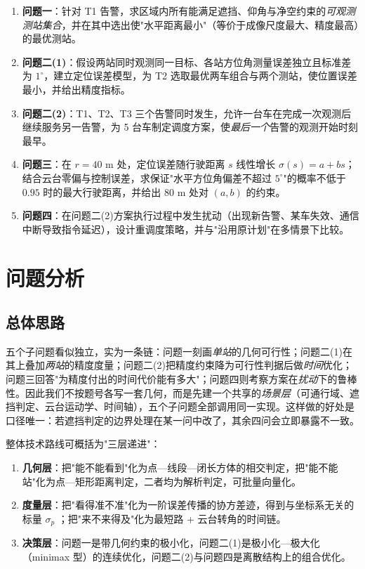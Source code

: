 \documentclass[UTF8,a4paper,zihao=-4,oneside]{ctexart}
\begin{document}
\begin{enumerate}[leftmargin=2em]
  \item \textbf{问题一}：针对 T1 告警，求区域内所有能满足遮挡、仰角与净空约束的\emph{可观测测站集合}，并在其中选出使"水平距离最小"（等价于成像尺度最大、精度最高）的最优测站。
  \item \textbf{问题二(1)}：假设两站同时观测同一目标、各站方位角测量误差独立且标准差为 $1^\circ$，建立定位误差模型，为 T2 选取最优两车组合与两个测站，使位置误差最小，并给出精度指标。
  \item \textbf{问题二(2)}：T1、T2、T3 三个告警同时发生，允许一台车在完成一次观测后继续服务另一告警，为 5 台车制定调度方案，使\emph{最后一个}告警的观测开始时刻最早。
  \item \textbf{问题三}：在 $r=40$ m 处，定位误差随行驶距离 $s$ 线性增长 $\sigma(s)=a+bs$；结合云台零偏与控制误差，求保证"水平方位角偏差不超过 $5^\circ$"的概率不低于 $0.95$ 时的最大行驶距离，并给出 $80$ m 处对 $(a,b)$ 的约束。
  \item \textbf{问题四}：在问题二(2)方案执行过程中发生扰动（出现新告警、某车失效、通信中断导致指令延迟），设计重调度策略，并与"沿用原计划"在多情景下比较。
\end{enumerate}

\section{问题分析}

\subsection{总体思路}

五个子问题看似独立，实为一条链：问题一刻画\emph{单站}的几何可行性；问题二(1)在其上叠加\emph{两站}的精度度量；问题二(2)把精度约束降为可行性判据后做\emph{时间}优化；问题三回答"为精度付出的时间代价能有多大"；问题四则考察方案在\emph{扰动}下的鲁棒性。因此我们不按题号各写一套几何，而是先建一个共享的\emph{场景层}（可通行域、遮挡判定、云台运动学、时间轴），五个子问题全部调用同一实现。这样做的好处是口径唯一：若遮挡判定的边界处理在某一问中改了，其余四问会立即暴露不一致。

整体技术路线可概括为"三层递进"：
\begin{enumerate}[leftmargin=2em]
  \item \textbf{几何层}：把"能不能看到"化为点—线段—闭长方体的相交判定，把"能不能站"化为点—矩形距离判定，二者均为解析判定，可批量向量化。
  \item \textbf{度量层}：把"看得准不准"化为一阶误差传播的协方差迹，得到与坐标系无关的标量 $\sigma_p$ ；把"来不来得及"化为最短路 + 云台转角的时间链。
  \item \textbf{决策层}：问题一是带几何约束的极小化，问题二(1)是极小化—极大化（minimax 型）的连续优化，问题二(2)与问题四是离散结构上的组合优化。
\end{enumerate}
\end{document}
